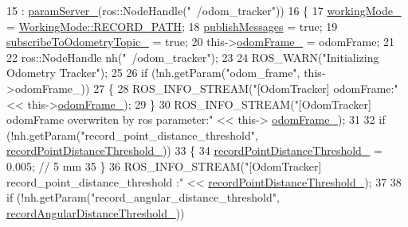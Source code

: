 \begin{DoxyCode}
15   : \hyperlink{classcl__move__base__z_1_1odom__tracker_1_1OdomTracker_a8bee0a1a49b5f736a7d7a741e56f7b02}{paramServer\_}(ros::NodeHandle(\textcolor{stringliteral}{"~/odom\_tracker"}))
16 \{
17   \hyperlink{classcl__move__base__z_1_1odom__tracker_1_1OdomTracker_a5ae598c85c4469f4c0e984480575c42b}{workingMode\_} = \hyperlink{namespacecl__move__base__z_1_1odom__tracker_ac46b05813b2791604f6cd0a39ace3ef8a023bc3adf68871ef7a0c616765ac80a7}{WorkingMode::RECORD\_PATH};
18   \hyperlink{classcl__move__base__z_1_1odom__tracker_1_1OdomTracker_a4f253d45ab5750dee3c2f18dd5599725}{publishMessages} = \textcolor{keyword}{true};
19   \hyperlink{classcl__move__base__z_1_1odom__tracker_1_1OdomTracker_afbe614b53a1493eb8268b8ea65b5b93a}{subscribeToOdometryTopic\_} = \textcolor{keyword}{true};
20   this->\hyperlink{classcl__move__base__z_1_1odom__tracker_1_1OdomTracker_a54f31af5e74006560d94f266297853d4}{odomFrame\_} = odomFrame;
21 
22   ros::NodeHandle nh(\textcolor{stringliteral}{"~/odom\_tracker"});
23 
24   ROS\_WARN(\textcolor{stringliteral}{"Initializing Odometry Tracker"});
25 
26   \textcolor{keywordflow}{if} (!nh.getParam(\textcolor{stringliteral}{"odom\_frame"}, this->odomFrame\_))
27   \{
28     ROS\_INFO\_STREAM(\textcolor{stringliteral}{"[OdomTracker] odomFrame:"} << this->\hyperlink{classcl__move__base__z_1_1odom__tracker_1_1OdomTracker_a54f31af5e74006560d94f266297853d4}{odomFrame\_});
29   \}
30   ROS\_INFO\_STREAM(\textcolor{stringliteral}{"[OdomTracker] odomFrame overwriten by ros parameter:"} << this->
      \hyperlink{classcl__move__base__z_1_1odom__tracker_1_1OdomTracker_a54f31af5e74006560d94f266297853d4}{odomFrame\_});
31 
32   \textcolor{keywordflow}{if} (!nh.getParam(\textcolor{stringliteral}{"record\_point\_distance\_threshold"}, 
      \hyperlink{classcl__move__base__z_1_1odom__tracker_1_1OdomTracker_a3a1173716d527bd182d04656491e01dd}{recordPointDistanceThreshold\_}))
33   \{
34     \hyperlink{classcl__move__base__z_1_1odom__tracker_1_1OdomTracker_a3a1173716d527bd182d04656491e01dd}{recordPointDistanceThreshold\_} = 0.005;  \textcolor{comment}{// 5 mm}
35   \}
36   ROS\_INFO\_STREAM(\textcolor{stringliteral}{"[OdomTracker] record\_point\_distance\_threshold :"} << 
      \hyperlink{classcl__move__base__z_1_1odom__tracker_1_1OdomTracker_a3a1173716d527bd182d04656491e01dd}{recordPointDistanceThreshold\_});
37 
38   \textcolor{keywordflow}{if} (!nh.getParam(\textcolor{stringliteral}{"record\_angular\_distance\_threshold"}, 
      \hyperlink{classcl__move__base__z_1_1odom__tracker_1_1OdomTracker_a1274fe5334c109cd9c2339beb9411441}{recordAngularDistanceThreshold\_}))

\end{DoxyCode}
